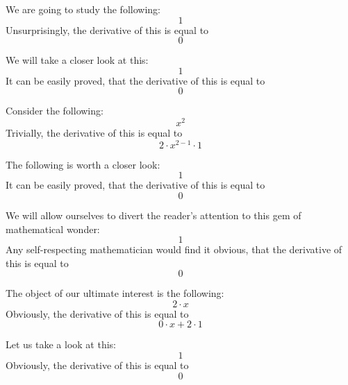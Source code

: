 \documentclass{article}
\begin{document}
We are going to study the following:
\begin{equation}
1 
\end{equation}
Unsurprisingly, the derivative of this is equal to
\begin{equation}
0 
\end{equation}

We will take a closer look at this:
\begin{equation}
1 
\end{equation}
It can be easily proved, that the derivative of this is equal to
\begin{equation}
0 
\end{equation}

Consider the following:
\begin{equation}
x ^{2 } 
\end{equation}
Trivially, the derivative of this is equal to
\begin{equation}
2 \cdot x ^{2 - 1 } \cdot 1 
\end{equation}

The following is worth a closer look:
\begin{equation}
1 
\end{equation}
It can be easily proved, that the derivative of this is equal to
\begin{equation}
0 
\end{equation}

We will allow ourselves to divert the reader's attention to this gem of mathematical wonder:
\begin{equation}
1 
\end{equation}
Any self-respecting mathematician would find it obvious, that the derivative of this is equal to
\begin{equation}
0 
\end{equation}

The object of our ultimate interest is the following:
\begin{equation}
2 \cdot x 
\end{equation}
Obviously, the derivative of this is equal to
\begin{equation}
0 \cdot x + 2 \cdot 1 
\end{equation}

Let us take a look at this:
\begin{equation}
1 
\end{equation}
Obviously, the derivative of this is equal to
\begin{equation}
0 
\end{equation}
\end{document}
